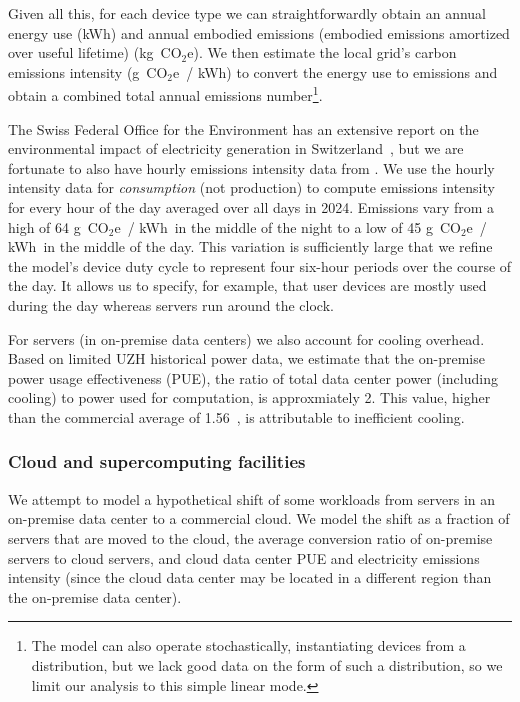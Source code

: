\documentclass[11pt]{article}
\newcommand{\coe}{CO$_2$e}
\newcommand{\gcoe}{g~\coe}
\newcommand{\kgcoe}{k\gcoe}
\newcommand{\gcoekwh}{\gcoe\ / kWh}
\begin{document}
Given all this, for each device type we can straightforwardly obtain an annual energy use (kWh) and annual embodied emissions (embodied emissions amortized over useful lifetime) (\kgcoe). We then estimate the local grid's carbon emissions intensity (\gcoekwh) to convert the energy use to emissions and obtain a combined total annual emissions number\footnote{The model can also operate stochastically, instantiating devices from a distribution, but we lack good data on the  form of such a distribution, so we limit our analysis to this simple linear mode.}.

The Swiss Federal Office for the Environment has an extensive report on the environmental impact of electricity generation in Switzerland~\cite{krebs2018umweltbilanz}, but we are fortunate to also have hourly emissions intensity data from \textcite{electricitymaps}. We use the hourly intensity data for {\em consumption} (not production) to compute emissions intensity for every hour of the day averaged over all days in 2024. Emissions vary from a high of 64 \gcoekwh\ in the middle of the night to a low of 45 \gcoekwh\ in the middle of the day. This variation is sufficiently large that we refine the model's device duty cycle to represent four six-hour periods over the course of the day. It allows us to specify, for example, that user devices are mostly used during the day whereas servers run around the clock.

For servers (in on-premise data centers) we also account for cooling overhead. Based on limited UZH historical power data, we estimate that the on-premise power usage effectiveness (PUE), the ratio of total data center power (including cooling) to power used for computation, is approxmiately 2. This value, higher than the commercial average of 1.56~\cite{google:datacenter:efficiency}, is attributable to inefficient cooling.

\subsubsection*{Cloud and supercomputing facilities}

We attempt to model a hypothetical shift of some workloads from servers in an on-premise data center to a commercial cloud. We model the shift as a fraction of servers that are moved to the cloud, the average conversion ratio of on-premise servers to cloud servers, and cloud data center PUE and electricity emissions intensity (since the cloud data center may be located in a different region than the on-premise data center).
\end{document}
